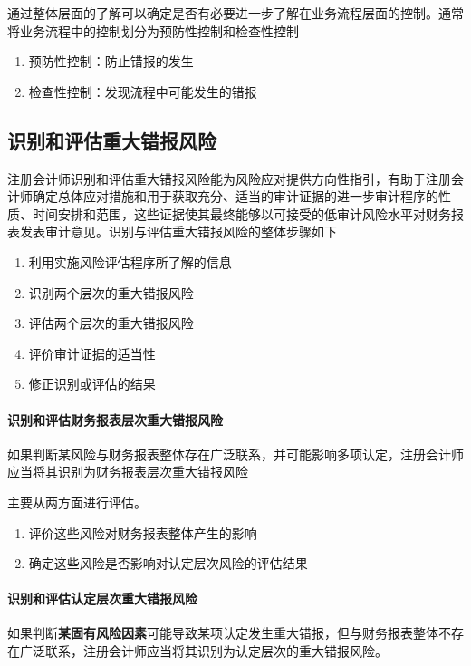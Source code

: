 \documentclass[UTF8,12pt]{ctexart}
\numberwithin{equation}{section} %
\numberwithin{figure}{section}
\numberwithin{table}{section}
\begin{document}
	通过整体层面的了解可以确定是否有必要进一步了解在业务流程层面的控制。通常将业务流程中的控制划分为预防性控制和检查性控制
	\begin{enumerate}
		\item 预防性控制：防止错报的发生
		
		\item 检查性控制：发现流程中可能发生的错报
	\end{enumerate}
	
	\subsection{识别和评估重大错报风险}
	注册会计师识别和评估重大错报风险能为风险应对提供方向性指引，有助于注册会计师确定总体应对措施和用于获取充分、适当的审计证据的进一步审计程序的性质、时间安排和范围，这些证据使其最终能够以可接受的低审计风险水平对财务报表发表审计意见。识别与评估重大错报风险的整体步骤如下
	\begin{enumerate}
		\item 利用实施风险评估程序所了解的信息
		
		\item 识别两个层次的重大错报风险
		
		\item 评估两个层次的重大错报风险
		
		\item 评价审计证据的适当性
		
		\item 修正识别或评估的结果
	\end{enumerate}
	
	\paragraph{识别和评估财务报表层次重大错报风险}
	如果判断某风险与财务报表整体存在广泛联系，并可能影响多项认定，注册会计师应当将其识别为财务报表层次重大错报风险
	
	主要从两方面进行评估。
	\begin{enumerate}
		\item 评价这些风险对财务报表整体产生的影响
		
		\item 确定这些风险是否影响对认定层次风险的评估结果
	\end{enumerate}
	
	\paragraph{识别和评估认定层次重大错报风险}
	如果判断\textbf{某固有风险因素}可能导致某项认定发生重大错报，但与财务报表整体不存在广泛联系，注册会计师应当将其识别为认定层次的重大错报风险。
	
\end{document}
